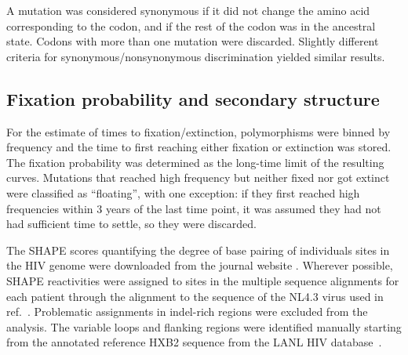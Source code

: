 \documentclass[rmp, twocolumn]{revtex4}
\begin{document}
A mutation was considered synonymous if it did not change the amino acid
corresponding to the codon, and if the rest of the codon was in the ancestral
state. Codons with more than one mutation were discarded. Slightly different
criteria for synonymous/nonsynonymous discrimination yielded similar results.

\subsection{Fixation probability and secondary structure}
For the estimate of times to fixation/extinction, polymorphisms were binned by
frequency and the time to first reaching either fixation or extinction was
stored. The fixation probability was determined as the long-time limit of the
resulting curves. Mutations that reached high frequency but neither fixed nor
got extinct were classified as ``floating'', with one exception: if they first
reached high frequencies within 3 years of the last time point, it was assumed
they had not had sufficient time to settle, so they were discarded.

The SHAPE scores quantifying the degree of base pairing of individuals sites in
the HIV genome were downloaded from the journal website
\citep{watts_architecture_2009}. Wherever possible, SHAPE reactivities were
assigned to sites in the multiple sequence alignments for each patient through
the alignment to the sequence of the NL4.3 virus used in
ref.~\citep{watts_architecture_2009}. Problematic assignments in indel-rich
regions were excluded from the analysis. The variable loops and flanking
regions were identified manually starting from the annotated reference HXB2
sequence from the LANL HIV database~\citep{LANL2012}. 

\end{document}
